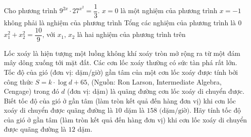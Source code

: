 \begin{ex}%
	Cho phương trình $9^{2x}\cdot27^{x^2}=\dfrac{1}{3}$.
	\choiceTF
	{$x=0$ là một nghiệm của phương trình}
	{$x=-1$ không phải là nghiệm của phương trình}
	{Tổng các nghiệm của phương trình là $ 0 $}
	{\True $x_1^2+x_2^2=\dfrac{10}{9}$, với $x_1$, $x_2$ là hai nghiệm của phương trình trên}
\end{ex}

\begin{ex}%
	Lốc xoáy là hiện tượng một luồng không khí xoáy tròn mở rộng ra từ một đám mây dông xuống tới mặt đất. Các cơn lốc xoáy thường có sức tàn phá rất lớn. Tốc độ của gió (đơn vị: dặm/giờ) gần tâm của một cơn lốc xoáy được tính bởi công thức $S=k\cdot\log d+65$, (Nguồn: Ron Larson, Intermediate Algebra, Cengage) trong đó $d$ (đơn vị: dặm) là quãng đường cơn lốc xoáy di chuyển được. Biết  tốc độ của gió ở gần tâm (làm tròn kết quả đến hàng đơn vị) khi cơn lốc xoáy di chuyển được quãng đường là $ 10 $ dặm là $ 158\text { (dặm/giờ)} $. Hãy tính tốc độ của gió ở gần tâm (làm tròn kết quả đến hàng đơn vị) khi cơn lốc xoáy di chuyển được quãng đường là $ 12 $ dặm.
\end{ex}

